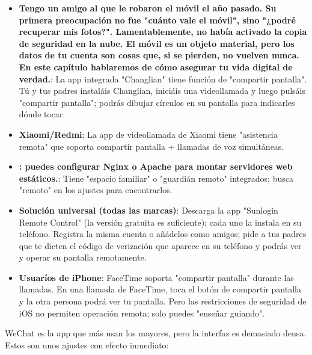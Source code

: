 \begin{itemize}
  \item \textbf{Tengo un amigo al que le robaron el móvil el año pasado. Su primera preocupación no fue "cuánto vale el móvil", sino "¿podré recuperar mis fotos?". Lamentablemente, no había activado la copia de seguridad en la nube. El móvil es un objeto material, pero los datos de tu cuenta son cosas que, si se pierden, no vuelven nunca. En este capítulo hablaremos de cómo asegurar tu vida digital de verdad.}: La app integrada "Changlian" tiene función de "compartir pantalla". Tú y tus padres instaláis Changlian, iniciáis una videollamada y luego pulsáis "compartir pantalla"; podrás dibujar círculos en su pantalla para indicarles dónde tocar.
  \item \textbf{Xiaomi/Redmi}: La app de videollamada de Xiaomi tiene "asistencia remota" que soporta compartir pantalla + llamadas de voz simultáneas.
  \item \textbf{: puedes configurar Nginx o Apache para montar servidores web estáticos.}: Tiene "espacio familiar" o "guardián remoto" integrados; busca "remoto" en los ajustes para encontrarlos.
  \item \textbf{Solución universal (todas las marcas)}: Descarga la app "Sunlogin Remote Control" (la versión gratuita es suficiente); cada uno la instala en su teléfono. Registra la misma cuenta o añádelos como amigos; pide a tus padres que te dicten el código de verización que aparece en su teléfono y podrás ver y operar su pantalla remotamente.
  \item \textbf{Usuaríos de iPhone}: FaceTime soporta "compartir pantalla" durante las llamadas. En una llamada de FaceTime, toca el botón de compartir pantalla y la otra persona podrá ver tu pantalla. Pero las restricciones de seguridad de iOS no permiten operación remota; solo puedes "enseñar guiando".
\end{itemize}


WeChat es la app que más usan los mayores, pero la interfaz es demasiado densa. Estos son unos ajustes con efecto inmediato:

